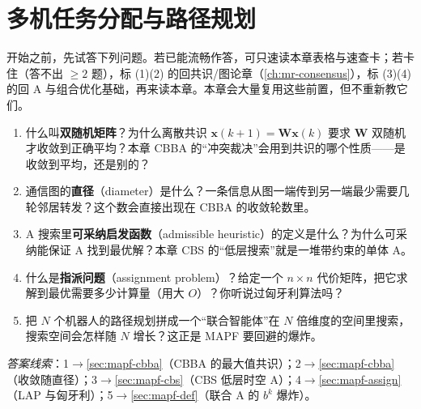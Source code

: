 \chapter{多机任务分配与路径规划}
\label{ch:mr-mapf}



\begin{practice}[前置自测]
开始之前，先试答下列问题。若已能流畅作答，可只速读本章表格与速查卡；若卡住（答不出 $\ge 2$ 题），标 (1)(2) 的回共识/图论章（\cref{ch:mr-consensus}），标 (3)(4) 的回 A\* 与组合优化基础，再来读本章。本章会大量复用这些前置，但不重新教它们。
\begin{enumerate}
  \item 什么叫\textbf{双随机矩阵}？为什么离散共识 $\mathbf{x}(k{+}1)=\mathbf{W}\mathbf{x}(k)$ 要求 $\mathbf{W}$ 双随机才收敛到正确平均？本章 CBBA 的“冲突裁决”会用到共识的哪个性质——是收敛到平均，还是别的？
  \item 通信图的\textbf{直径}（diameter）是什么？一条信息从图一端传到另一端最少需要几轮邻居转发？这个数会直接出现在 CBBA 的收敛轮数里。
  \item A\* 搜索里\textbf{可采纳启发函数}（admissible heuristic）的定义是什么？为什么可采纳能保证 A\* 找到最优解？本章 CBS 的“低层搜索”就是一堆带约束的单体 A\*。
  \item 什么是\textbf{指派问题}（assignment problem）？给定一个 $n\times n$ 代价矩阵，把它求解到最优需要多少计算量（用大 $O$）？你听说过匈牙利算法吗？
  \item 把 $N$ 个机器人的路径规划拼成一个“联合智能体”在 $N$ 倍维度的空间里搜索，搜索空间会怎样随 $N$ 增长？这正是 MAPF 要回避的爆炸。
\end{enumerate}
\noindent\emph{答案线索}：1$\to$\cref{sec:mapf-cbba}（CBBA 的最大值共识）；2$\to$\cref{sec:mapf-cbba}（收敛随直径）；3$\to$\cref{sec:mapf-cbs}（CBS 低层时空 A\*）；4$\to$\cref{sec:mapf-assign}（LAP 与匈牙利）；5$\to$\cref{sec:mapf-def}（联合 A\* 的 $b^k$ 爆炸）。
\end{practice}

